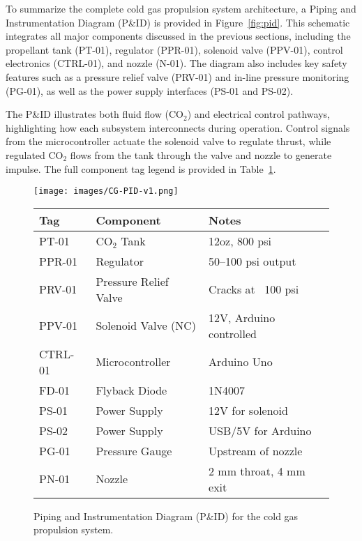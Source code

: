 \documentclass{new-aiaa}
\begin{document}
To summarize the complete cold gas propulsion system architecture, a Piping and Instrumentation Diagram (P\&ID) is provided in Figure~\ref{fig:pid}. This schematic integrates all major components discussed in the previous sections, including the propellant tank (PT-01), regulator (PPR-01), solenoid valve (PPV-01), control electronics (CTRL-01), and nozzle (N-01). The diagram also includes key safety features such as a pressure relief valve (PRV-01) and in-line pressure monitoring (PG-01), as well as the power supply interfaces (PS-01 and PS-02).

The P\&ID illustrates both fluid flow (CO$_2$) and electrical control pathways, highlighting how each subsystem interconnects during operation. Control signals from the microcontroller actuate the solenoid valve to regulate thrust, while regulated CO$_2$ flows from the tank through the valve and nozzle to generate impulse. The full component tag legend is provided in Table~\ref{tab:pid-legend}.



\begin{figure}[H]
\centering
\begin{minipage}{0.7\textheight}
    \centering
    \texttt{[image: images/CG-PID-v1.png]} 
    \caption{Piping and Instrumentation Diagram (P\&ID) for the cold gas propulsion system.}
    \label{fig:pid}
\end{minipage}
\hfill
\begin{minipage}{0.45\textheight}
    \centering
    \begin{tabular}{lll}
        \toprule
        \textbf{Tag} & \textbf{Component} & \textbf{Notes} \\
        \midrule
        PT-01 & CO$_2$ Tank & 12oz, 800 psi \\
        PPR-01 & Regulator & 50–100 psi output \\
        PRV-01 & Pressure Relief Valve & Cracks at ~100 psi \\
        PPV-01 & Solenoid Valve (NC) & 12V, Arduino controlled \\
        CTRL-01 & Microcontroller & Arduino Uno \\
        FD-01 & Flyback Diode & 1N4007 \\
        PS-01 & Power Supply & 12V for solenoid \\
        PS-02 & Power Supply & USB/5V for Arduino \\
        PG-01 & Pressure Gauge & Upstream of nozzle \\
        PN-01 & Nozzle & 2 mm throat, 4 mm exit \\
        \bottomrule
    \end{tabular}
    \label{tab:pid-legend}
\end{minipage}
\end{figure}
\end{document}

